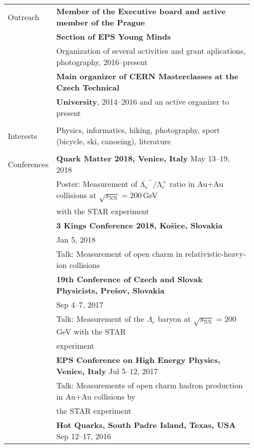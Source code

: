 \documentclass[letterpaper,11pt,oneside]{article}
\begin{document}
\noindent  \begin{tabular}{@{} l l}
\Large{Outreach }    
     & \textbf{Member of the Executive board and active member of the Prague} \\
     & \textbf{Section of EPS Young Minds} \\
     & Organization of several activities and grant aplications, photography, 2016--present \\[.2cm]
     & \textbf{Main organizer of CERN Masterclasses at the Czech Technical} \\
     & \textbf{University}, 2014--2016 and an active organizer to present \\
     & \\
\Large{Interests}    
     & Physics, informatics, hiking, photography, sport (bicycle, ski, canoeing), literature \\
     & \\
\Large{Conferences}
     & \textbf{Quark Matter 2018, Venice, Italy} May 13--19, 2018 \\
     & Poster: Measurement of $\mathrm{\overline{\Lambda_c}^-/\Lambda_c^+}$ ratio in Au+Au collisions at $\sqrt{s_\mathrm{NN}} = 200\,$GeV\\
     &with the STAR experiment \\[.2cm]
     & \textbf{3 Kings Conference 2018, Košice, Slovakia} \\
     & Jan 5, 2018 \\
     & Talk: Measurement of open charm in relativistic-heavy-ion collisions \\[.2cm]
     & \textbf{19th Conference of Czech and Slovak Physicists, Prešov, Slovakia}\\
     & Sep 4--7, 2017 \\
     & Talk: Measurement of the $\Lambda_\mathrm{c}$ baryon at $\sqrt{s_\mathrm{NN}} = 200\,$GeV with the STAR \\
     & experiment\\[.2cm]
     & \textbf{EPS Conference on High Energy Physics, Venice, Italy} Jul 5--12, 2017\\
     & Talk: Measurements of open charm hadron production in Au+Au collisions by  \\
     & the STAR experiment \\[.2cm]
     & \textbf{Hot Quarks, South Padre Island, Texas, USA} Sep 12--17, 2016\\

\end{tabular}
\end{document}
